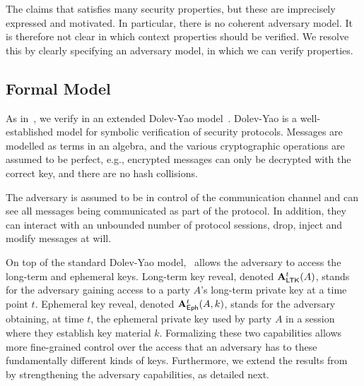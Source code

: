 The \mEdhoc{} \mSpec{} \cite{our-analysis-selander-lake-edhoc-00} claims
that \mEdhoc{} satisfies many security properties, but these are imprecisely
expressed and motivated.
%
In particular, there is no coherent adversary model.
%
It is therefore not clear in which context properties should be verified.
%
We resolve this by clearly specifying an adversary model, in which we can 
verify
properties.
%

\subsection{Formal Model}\label{sec:threat-model}
As in~\cite{Norr21}, we verify \mEdhoc{} in an extended
Dolev-Yao model~\cite{DY83}.
%
Dolev-Yao is a well-established model for symbolic verification of security
protocols.
%
Messages are modelled as terms in an algebra, and the various cryptographic
operations are assumed to be perfect, e.g., encrypted messages can only be
decrypted with the correct key, and there are no hash collisions.
%

The adversary is assumed to be in control of the communication
channel and can see all messages being communicated as part of the protocol.
%
In addition, they can interact with an unbounded number of protocol sessions,
drop, inject and modify messages at will.
%

On top of the standard Dolev-Yao model,~\cite{Norr21} allows the adversary to
access the long-term and ephemeral keys.
%
Long-term key reveal, denoted $\mathbf{A}_{\textsf{LTK}}^{t}(A)$, stands for the adversary
gaining access to a party $A$'s long-term private key  at a time point $t$.
%
Ephemeral key reveal, denoted $\mathbf{A}_{\textsf{Eph}}^{t}(A, k)$, stands for the adversary
obtaining, at time $t$, the ephemeral private key  used by party $A$
in a session where they establish key material $k$.
%
Formalizing these two capabilities allows more fine-grained control
over the access that an adversary has to these fundamentally different kinds of
keys.
%
Furthermore, we extend the results from~\cite{Norr21} by strengthening the
adversary capabilities, as detailed next.
%

